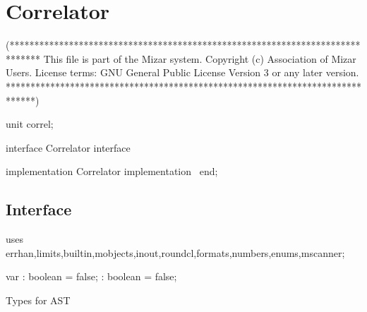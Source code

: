 
\chapter{Correlator}


\nwenddocs{}\endmoddef\nwstartdeflinemarkup\nwenddeflinemarkup
(******************************************************************************
   This file is part of the Mizar system.
   Copyright (c) Association of Mizar Users.
   License terms: GNU General Public License Version 3 or any later version.
******************************************************************************)

unit correl;

interface
\LA{}Correlator interface~{\nwtagstyle{}}\RA{}

  
implementation
\LA{}Correlator implementation~{\nwtagstyle{}}\RA{}
end;
\nwendcode{}\nwdocspar

\section{Interface}
\nwenddocs{}\endmoddef\nwstartdeflinemarkup{}\nwenddeflinemarkup
uses errhan,limits,builtin,mobjects,inout,roundcl,formats,numbers,enums,mscanner;

var : boolean = false;
    : boolean = false;

\LA{}Types for AST~{\nwtagstyle{}}\RA{}
                   
